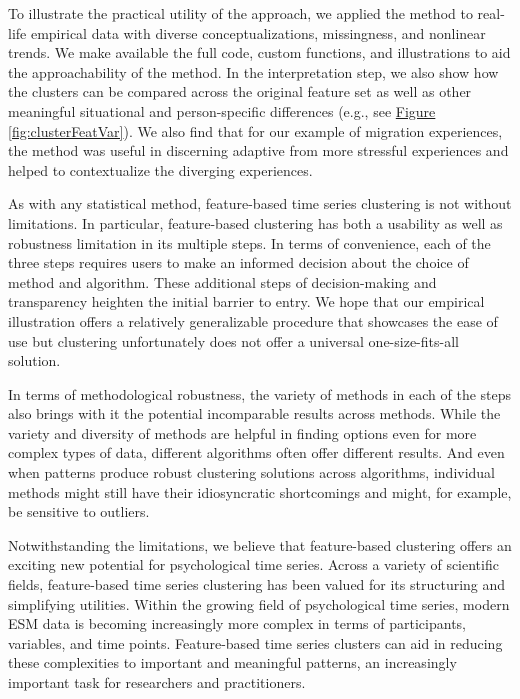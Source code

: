 \documentclass[man, 12pt, a4paper, mask, floatsintext]{apa7}
\theoremstyle{break}
\theoremstyle{plain}
\newcommand{\fgrref}[2][]{\hyperref[#2]{Figure \ref*{#2}#1}}
\begin{document}
To illustrate the practical utility of the approach, we applied the method to real-life empirical data with diverse conceptualizations, missingness, and nonlinear trends. We make available the full code, custom functions, and illustrations to aid the approachability of the method. In the interpretation step, we also show how the clusters can be compared across the original feature set as well as other meaningful situational and person-specific differences (e.g., see \fgrref{fig:clusterFeatVar}). We also find that for our example of migration experiences, the method was useful in discerning adaptive from more stressful experiences and helped to contextualize the diverging experiences.

As with any statistical method, feature-based time series clustering is not without limitations. 
In particular, feature-based clustering has both a usability as well as robustness limitation in its multiple steps. In terms of convenience, each of the three steps requires users to make an informed decision about the choice of method and algorithm. These additional steps of decision-making and transparency heighten the initial barrier to entry. We hope that our empirical illustration offers a relatively generalizable procedure that showcases the ease of use but clustering unfortunately does not offer a universal one-size-fits-all solution. 

In terms of methodological robustness, the variety of methods in each of the steps also brings with it the potential incomparable results across methods. While the variety and diversity of methods are helpful in finding options even for more complex types of data, different algorithms often offer different results. And even when patterns produce robust clustering solutions across algorithms, individual methods might still have their idiosyncratic shortcomings and might, for example, be sensitive to outliers. 

Notwithstanding the limitations, we believe that feature-based clustering offers an exciting new potential for psychological time series. Across a variety of scientific fields, feature-based time series clustering has been valued for its structuring and simplifying utilities. Within the growing field of psychological time series, modern ESM data is becoming increasingly more complex in terms of participants, variables, and time points. Feature-based time series clusters can aid in reducing these complexities to important and meaningful patterns, an increasingly important task for researchers and practitioners. 
\end{document}
